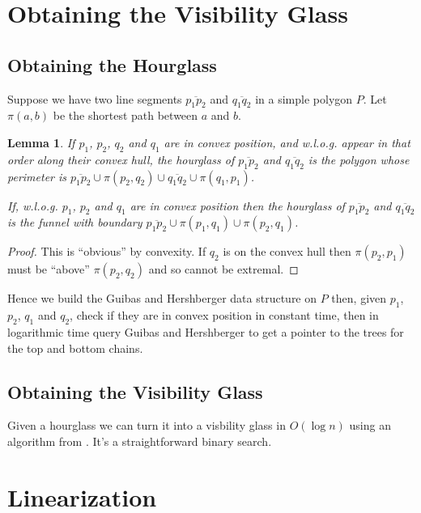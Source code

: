 \documentclass{article}
\newtheorem{lemma}{Lemma}
\begin{document}
\section{Obtaining the Visibility Glass}

\subsection{Obtaining the Hourglass}

Suppose we have two line segments $\overline{p_1 p_2}$ and $\overline{q_1 q_2}$ in a simple polygon $P$. Let $\pi(a, b)$ be the shortest path between $a$ and $b$.

\begin{lemma}
    If $p_1$, $p_2$, $q_2$ and $q_1$ are in convex position, and w.l.o.g. appear in that order along their convex hull, the hourglass of $\overline{p_1 p_2}$ and $\overline{q_1 q_2}$ is the polygon whose perimeter is $\overline{p_1 p_2} \cup \pi(p_2, q_2) \cup \overline{q_1 q_2} \cup \pi(q_1, p_1)$.
    
    If, w.l.o.g. $p_1$, $p_2$ and $q_1$ are in convex position then the hourglass of $\overline{p_1 p_2}$ and $\overline{q_1 q_2}$ is the funnel with boundary $\overline{p_1 p_2} \cup \pi(p_1, q_1) \cup \pi(p_2, q_1)$.
\end{lemma}

\begin{proof}
This is ``obvious'' by convexity. If $q_2$ is on the convex hull then $\pi(p_2, p_1)$ must be ``above'' $\pi(p_2, q_2)$ and so cannot be extremal.
\end{proof}

Hence we build the Guibas and Hershberger data structure on $P$ then, given $p_1$, $p_2$, $q_1$ and $q_2$, check if they are in convex position in constant time, then in logarithmic time query Guibas and Hershberger to get a pointer to the trees for the top and bottom chains.

\subsection{Obtaining the Visibility Glass}
Given a hourglass we can turn it into a visbility glass in $O(\log n)$ using an algorithm from \cite{GuibasHS91}. It's a straightforward binary search.

\section{Linearization}
\end{document}
